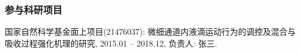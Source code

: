 \begin{achievements}
\medskip{}

\subsubsection*{\textbf{参与科研项目}}
\begin{enumerate}[label={[\arabic*]},itemsep=0pt,topsep=0pt]
\item 国家自然科学基金面上项目(21476037): 微细通道内液滴运动行为的调控及混合与吸收过程强化机理的研究, 2015.01 – 2018.12, 负责人: 张三.
\end{enumerate}

\end{achievements}
